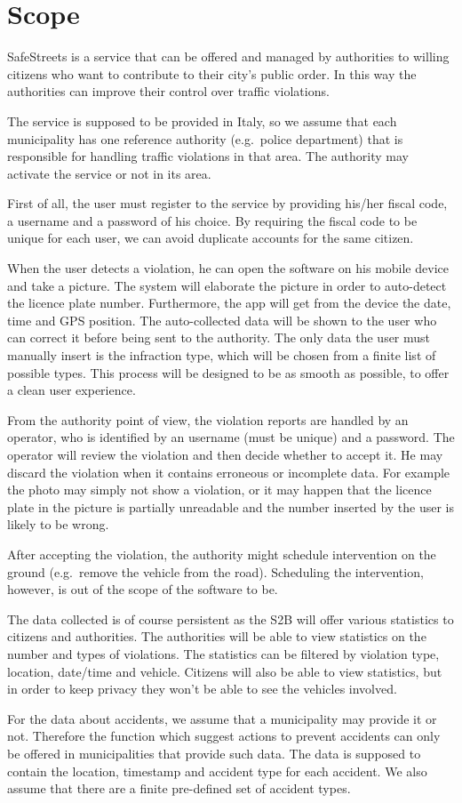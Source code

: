 \section{Scope}
SafeStreets is a service that can be offered and managed by authorities
to willing citizens who want to contribute to their city’s public order.
In this way the authorities can improve their control over traffic violations.

The service is supposed to be provided in Italy, so we assume that each
municipality has one reference authority (e.g.\ police department) that is
responsible for handling traffic violations in that area.
The authority may activate the service or not in its area.


First of all, the user must register to the service by providing his/her 
fiscal code, a username and a password of his choice.
By requiring the fiscal code to be unique for each user, we can avoid
duplicate accounts for the same citizen.

When the user detects a violation, he can open the software on his mobile 
device and take a picture. The system will elaborate the picture in order to 
auto-detect the licence plate number. Furthermore, the app will get from the 
device the date, time and GPS position. The auto-collected data will be shown 
to the user who can correct it before being sent to the authority.
The only data the user must manually insert is the infraction type, which 
will be chosen from a finite list of possible types.
This process will be designed to be as smooth as possible, to offer a clean 
user experience.

From the authority point of view, the violation reports are handled by
an operator, who is identified by an username (must be unique) and
a password.
The operator will review the violation and then decide whether to accept it.
He may discard the violation when it contains erroneous or incomplete data.
For example the photo may simply not show a violation, or it may happen that
the licence plate in the picture is partially unreadable and the number
inserted by the user is likely to be wrong.

After accepting the violation, the authority might schedule intervention
on the ground (e.g.\ remove the vehicle from the road).
Scheduling the intervention, however, is out of the scope of the software
to be.

The data collected is of course persistent as the S2B will offer various
statistics to citizens and authorities.
The authorities will be able to view statistics on the number and types of
violations.
The statistics can be filtered by violation type, location, date/time and
vehicle.
Citizens will also be able to view statistics, but in order to keep privacy
they won't be able to see the vehicles involved.

For the data about accidents, we assume that a municipality may provide it
or not. Therefore the function which suggest actions to prevent accidents
can only be offered in municipalities that provide such data.
The data is supposed to contain the location, timestamp and accident type for
each accident. We also assume that there are a finite pre-defined set of
accident types.